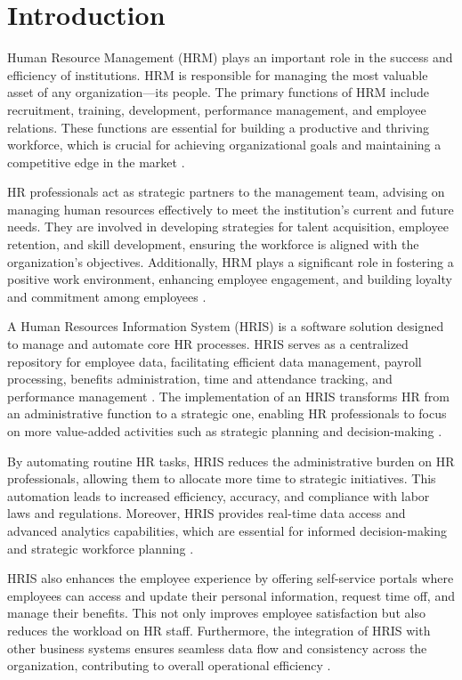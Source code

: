 \chapter{Introduction}
Human Resource Management (HRM) plays an important role in the success and efficiency of institutions. HRM is responsible for managing the most valuable asset of any organization—its people. The primary functions of HRM include recruitment, training, development, performance management, and employee relations. These functions are essential for building a productive and thriving workforce, which is crucial for achieving organizational goals and maintaining a competitive edge in the market \cite{a12019}\cite{t12020}.

HR professionals act as strategic partners to the management team, advising on managing human resources effectively to meet the institution's current and future needs. They are involved in developing strategies for talent acquisition, employee retention, and skill development, ensuring the workforce is aligned with the organization's objectives. Additionally, HRM plays a significant role in fostering a positive work environment, enhancing employee engagement, and building loyalty and commitment among employees \cite{b12021}\cite{d12022}.

A Human Resources Information System (HRIS) is a software solution designed to manage and automate core HR processes. HRIS serves as a centralized repository for employee data, facilitating efficient data management, payroll processing, benefits administration, time and attendance tracking, and performance management \cite{m22024}\cite{o12023}. The implementation of an HRIS transforms HR from an administrative function to a strategic one, enabling HR professionals to focus on more value-added activities such as strategic planning and decision-making \cite{n12023}.

By automating routine HR tasks, HRIS reduces the administrative burden on HR professionals, allowing them to allocate more time to strategic initiatives. This automation leads to increased efficiency, accuracy, and compliance with labor laws and regulations. Moreover, HRIS provides real-time data access and advanced analytics capabilities, which are essential for informed decision-making and strategic workforce planning \cite{gym12024}\cite{h12022}.

HRIS also enhances the employee experience by offering self-service portals where employees can access and update their personal information, request time off, and manage their benefits. This not only improves employee satisfaction but also reduces the workload on HR staff. Furthermore, the integration of HRIS with other business systems ensures seamless data flow and consistency across the organization, contributing to overall operational efficiency \cite{a22023}\cite{s12022}.

